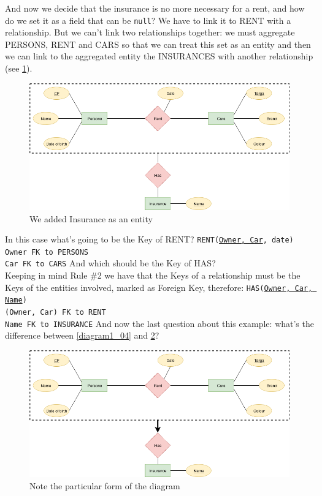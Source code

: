 \documentclass[class=book, crop=false, oneside]{standalone}
\newcommand\tab[1][1cm]{\hspace*{#1}}
\begin{document}
And now we decide that the insurance is no more necessary for a rent, and how do we set it as a field that can be \texttt{null}?
We have to link it to RENT with a relationship.
But we can't link two relationships together: we must aggregate PERSONS, RENT and CARS so that we can treat this set as an entity and then we can link to the aggregated entity the INSURANCES with another relationship (see \ref{diagram1_05}).
\begin{figure}[H]
	\includegraphics[width=\textwidth,keepaspectratio]{diagram1_05.png}
	\caption{We added Insurance as an entity}
	\label{diagram1_05}
\end{figure}
In this case what's going to be the Key of RENT?
\vskip 10pt
\texttt{RENT(\underline{Owner, Car}, date)}\\
	\tab[.8cm] \texttt{Owner FK to PERSONS}\\
	\tab[.8cm] \texttt{Car FK to CARS}
\vskip 10pt
\noindent And which should be the Key of HAS?\\
Keeping in mind Rule \#2 we have that the Keys of a relationship must be the Keys of the entities involved, marked as Foreign Key, therefore:
\vskip 10pt
\texttt{HAS(\underline{Owner, Car, Name})}\\
	\tab[.8cm] \texttt{(Owner, Car) FK to RENT}\\
	\tab[.8cm] \texttt{Name FK to INSURANCE}
\vskip 10pt
And now the last question about this example: what's the difference between \ref{diagram1_04} and \ref{diagram1_06}?
\begin{figure}[H]
	\includegraphics[width=\textwidth,keepaspectratio]{diagram1_06.png}
	\caption{Note the particular form of the diagram}
	\label{diagram1_06}
\end{figure}
\end{document}
